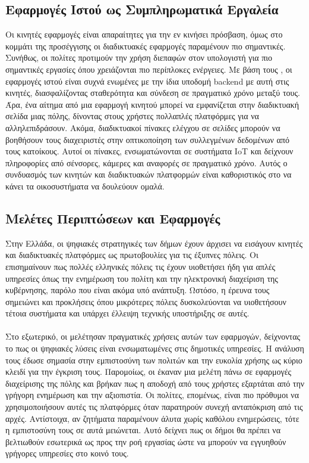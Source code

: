 \subsection{Εφαρμογές Ιστού ως Συμπληρωματικά Εργαλεία}
Οι κινητές εφαρμογές είναι απαραίτητες για την εν κινήσει πρόσβαση, όμως στο κομμάτι της προσέγγισης οι διαδικτυακές εφαρμογές παραμένουν πιο σημαντικές. Συνήθως, οι πολίτες προτιμούν την χρήση διεπαφών στον υπολογιστή για πιο σημαντικές εργασίες όπου χρειάζονται πιο περίπλοκες ενέργειες. Με βάση τους \textcite{aslam2020comprehensive}, οι εφαρμογές ιστού είναι συχνά ενωμένες με την ίδια υποδομή backend με αυτή στις κινητές, διασφαλίζοντας σταθερότητα και σύνδεση σε πραγματικό χρόνο μεταξύ τους. Άρα, ένα αίτημα από μια εφαρμογή κινητού μπορεί να εμφανίζεται στην διαδικτυακή σελίδα μιας πόλης, δίνοντας στους χρήστες πολλαπλές πλατφόρμες για να αλληλεπιδράσουν. Ακόμα, διαδικτυακοί πίνακες ελέγχου σε σελίδες μπορούν να βοηθήσουν τους διαχειριστές στην οπτικοποίηση των συλλεγμένων δεδομένων από τους κατοίκους. Αυτοί οι πίνακες, ενσωματώνονται σε συστήματα IoT και δείχνουν πληροφορίες από σένσορες, κάμερες και αναφορές σε πραγματικό χρόνο. Αυτός ο συνδυασμός των κινητών και διαδικτυακών πλατφορμών είναι καθοριστικός στο να κάνει τα οικοσυστήματα να δουλεύουν ομαλά.

\subsection{Μελέτες Περιπτώσεων και Εφαρμογές}
Στην Ελλάδα, οι ψηφιακές στρατηγικές των δήμων έχουν άρχισει να εισάγουν κινητές και διαδικτυακές πλατφόρμες ως πρωτοβουλίες για τις έξυπνες πόλεις. Οι \textcite{siokas2019} επισημαίνουν πως πολλές ελληνικές πόλεις τις έχουν υιοθετήσει ήδη για απλές υπηρεσίες όπως την ενημέρωση του πολίτη και την ηλεκτρονική διαχείριση της κυβέρνησης, παρόλο που είναι ακόμα υπό ανάπτυξη. Ωστόσο, η έρευνα τους σημειώνει και προκλήσεις όπου μικρότερες πόλεις δυσκολεύονται να υιοθετήσουν τέτοια συστήματα και υπάρχει έλλειψη τεχνικής υποστήριξης σε αυτές.
\\
\\
Στο εξωτερικό, οι \textcite{angelopoulos2019} μελέτησαν πραγματικές χρήσεις αυτών των εφαρμογών, δείχνοντας το πως οι ψηφιακές λύσεις είναι ενσωματωμένες στις δημοτικές υπηρεσίες. Η ανάλυση τους έδωσε σημασία στην εμπιστοσύνη των πολιτών και την ευκολία χρήσης ως κύριο κλειδί για την έγκριση τους. Παρομοίως, οι \textcite{hou2020road} έκαναν μια μελέτη πάνω σε εφαρμογές διαχείρισης της πόλης και βρήκαν πως η αποδοχή από τους χρήστες εξαρτάται από την γρήγορη ενημέρωση και την αξιοπιστία. Οι πολίτες, επομένως, είναι πιο πρόθυμοι να χρησιμοποιήσουν αυτές τις πλατφόρμες όταν παρατηρούν συνεχή ανταπόκριση από τις αρχές. Αντίστοιχα, αν ζητήματα παραμένουν άλυτα χωρίς καθόλου ενημερώσεις, τότε η εμπιστοσύνη τους σε αυτά μειώνεται. Αυτό δείχνει πως οι δήμοι θα πρέπει να βελτιωθούν εσωτερικά ως προς την ροή εργασίας ώστε να μπορούν να εγγυηθούν γρήγορες υπηρεσίες στο κοινό τους. 

